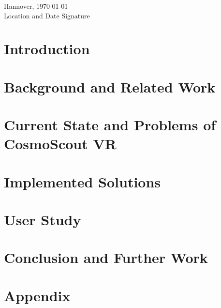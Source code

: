 \documentclass[11pt,DIV=12,BCOR=0mm,twoside,openright,headings=normal,%
  numbers=noenddot,headsepline,headinclude]{scrreprt}
\begin{document}
    \vspace*{3\baselineskip}
    \noindent
    Hannover, \today\\
    Location and Date\hspace{5cm} Signature

    \tableofcontents

    \cleardoublepage

    \chapter{Introduction}\label{ch:introduction}
        
    \chapter{Background and Related Work}\label{ch:background-and-related-work}
        
        
        
    \chapter{Current State and Problems of CosmoScout VR}\label{ch:current-state-and-problems-of-cosmoscout}
        
    \chapter{Implemented Solutions}\label{ch:implemented-solutions}
        
        
        
    \chapter{User Study}\label{ch:user-study}
        
    \chapter{Conclusion and Further Work}\label{ch:further-work}
        

    \appendix
    \chapter{Appendix}\label{ch:appendix}
        

    \renewcommand{\btxfnamespaceshort}{\,}
    
    
\end{document}
